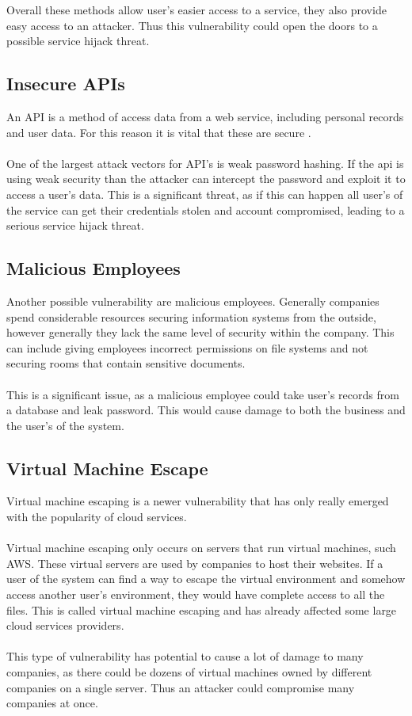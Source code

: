 Overall these methods allow user's easier access to a service, they also provide easy access to an attacker. Thus this vulnerability could open the doors to a possible service hijack threat.

\subsection{Insecure APIs}
An API is a method of access data from a web service, including personal records and user data. For this reason it is vital that these are secure \cite{lu_keeping_2014}.\\
\\
One of the largest attack vectors for API's is weak password hashing. If the api is using weak security than the attacker can intercept the password and exploit it to access a user's data. This is a significant threat, as if this can happen all user's of the service can get their credentials stolen and account compromised, leading to a serious service hijack threat.

\subsection{Malicious Employees}

Another possible vulnerability are malicious employees. Generally companies spend considerable resources securing information systems from the outside, however generally they lack the same level of security within the company. This can include giving employees incorrect permissions on file systems and not securing rooms that contain sensitive documents.\\
\\
This is a significant issue, as a malicious employee could take user's records from a database and leak password. This would cause damage to both the business and the user's of the system.

\subsection{Virtual Machine Escape}

Virtual machine escaping is a newer vulnerability that has only really emerged with the popularity of cloud services\cite{ramachandran_recommendations_2014}.\\
\\
Virtual machine escaping only occurs on servers that run virtual machines, such AWS\cite{aws_amazon_2016}. These virtual servers are used by companies to host their websites. If a user of the system can find a way to escape the virtual environment and somehow access another user's environment, they would have complete access to all the files. This is called virtual machine escaping and has already affected some large cloud services providers\cite{cloudstrike_venom_2016}.\\
\\
This type of vulnerability has potential to cause a lot of damage to many companies, as there could be dozens of virtual machines owned by different companies on a single server. Thus an attacker could compromise many companies at once.

